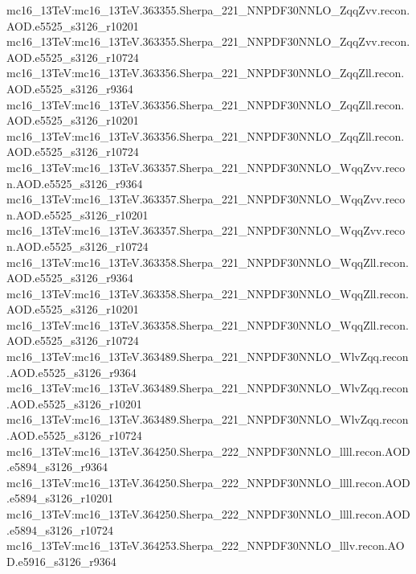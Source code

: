 { mc16\_13TeV:mc16\_13TeV.363355.Sherpa\_221\_NNPDF30NNLO\_ZqqZvv.recon.AOD.e5525\_s3126\_r10201\newline    
 mc16\_13TeV:mc16\_13TeV.363355.Sherpa\_221\_NNPDF30NNLO\_ZqqZvv.recon.AOD.e5525\_s3126\_r10724\newline    
 mc16\_13TeV:mc16\_13TeV.363356.Sherpa\_221\_NNPDF30NNLO\_ZqqZll.recon.AOD.e5525\_s3126\_r9364\newline    
 mc16\_13TeV:mc16\_13TeV.363356.Sherpa\_221\_NNPDF30NNLO\_ZqqZll.recon.AOD.e5525\_s3126\_r10201\newline    
 mc16\_13TeV:mc16\_13TeV.363356.Sherpa\_221\_NNPDF30NNLO\_ZqqZll.recon.AOD.e5525\_s3126\_r10724\newline    
 mc16\_13TeV:mc16\_13TeV.363357.Sherpa\_221\_NNPDF30NNLO\_WqqZvv.recon.AOD.e5525\_s3126\_r9364\newline    
 mc16\_13TeV:mc16\_13TeV.363357.Sherpa\_221\_NNPDF30NNLO\_WqqZvv.recon.AOD.e5525\_s3126\_r10201\newline    
 mc16\_13TeV:mc16\_13TeV.363357.Sherpa\_221\_NNPDF30NNLO\_WqqZvv.recon.AOD.e5525\_s3126\_r10724\newline    
 mc16\_13TeV:mc16\_13TeV.363358.Sherpa\_221\_NNPDF30NNLO\_WqqZll.recon.AOD.e5525\_s3126\_r9364\newline    
 mc16\_13TeV:mc16\_13TeV.363358.Sherpa\_221\_NNPDF30NNLO\_WqqZll.recon.AOD.e5525\_s3126\_r10201\newline    
 mc16\_13TeV:mc16\_13TeV.363358.Sherpa\_221\_NNPDF30NNLO\_WqqZll.recon.AOD.e5525\_s3126\_r10724\newline    
 mc16\_13TeV:mc16\_13TeV.363489.Sherpa\_221\_NNPDF30NNLO\_WlvZqq.recon.AOD.e5525\_s3126\_r9364\newline    
 mc16\_13TeV:mc16\_13TeV.363489.Sherpa\_221\_NNPDF30NNLO\_WlvZqq.recon.AOD.e5525\_s3126\_r10201\newline    
 mc16\_13TeV:mc16\_13TeV.363489.Sherpa\_221\_NNPDF30NNLO\_WlvZqq.recon.AOD.e5525\_s3126\_r10724\newline    
 mc16\_13TeV:mc16\_13TeV.364250.Sherpa\_222\_NNPDF30NNLO\_llll.recon.AOD.e5894\_s3126\_r9364\newline    
 mc16\_13TeV:mc16\_13TeV.364250.Sherpa\_222\_NNPDF30NNLO\_llll.recon.AOD.e5894\_s3126\_r10201\newline    
 mc16\_13TeV:mc16\_13TeV.364250.Sherpa\_222\_NNPDF30NNLO\_llll.recon.AOD.e5894\_s3126\_r10724\newline    
 mc16\_13TeV:mc16\_13TeV.364253.Sherpa\_222\_NNPDF30NNLO\_lllv.recon.AOD.e5916\_s3126\_r9364\newline    
}
